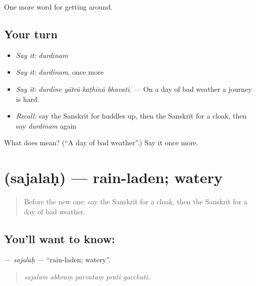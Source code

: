 \begin{grammarlens}[title={What you've built}]
One more word for getting around.
\end{grammarlens}

\subsection*{Your turn}
\begin{itemize}
\raggedright
  \item \emph{Say it:} \emph{durdinam}
  \item \emph{Say it:} \emph{durdinam}, once more
  \item \emph{Say it:} \emph{durdine yātrā kaṭhinā bhavati.} — On a day of bad weather a journey is hard.
  \item \emph{Recall:} say the Sanskrit for huddles up, then the Sanskrit for a cloak, then say \emph{durdinam} again
\end{itemize}

\begin{tcolorbox}[breakable,colback=teal!4,colframe=teal!35!black,title={Before you move on}]
What does  mean? (\textquotedblleft{}A day of bad weather\textquotedblright{}.) Say it once more.
\end{tcolorbox}
\section[\texorpdfstring{\sk{सजलः} (sajalaḥ)}{सजलः (sajalaḥ)}]{ (sajalaḥ) — rain-laden; watery}

\label{lesson:SA-C441-sajalah}



\begin{quote}
Before the new one: say the Sanskrit for a cloak, then the Sanskrit for a day of bad weather.
\end{quote}

\subsection*{You'll want to know: }
\textbf{} — \emph{sajalaḥ} — \textquotedblleft{}rain-laden; watery\textquotedblright{}.

\begin{quote}
    
\end{quote}

\begin{quote}
\emph{sajalam abhraṃ parvataṃ prati gacchati.}
\end{quote}

